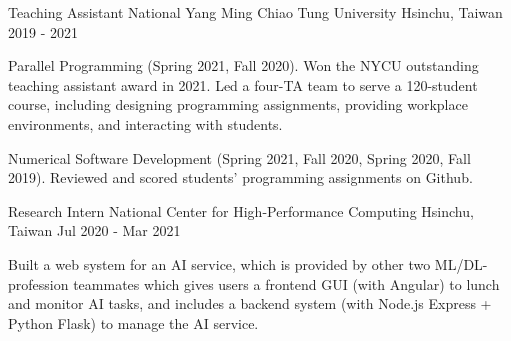
\vspace{-2mm}

\begin{cventries}

  \cventry
    {Teaching Assistant} %
    {National Yang Ming Chiao Tung University} %
    {Hsinchu, Taiwan} %
    {2019 - 2021} %
    {
      \begin{cvitems} %
        \item {Parallel Programming (Spring 2021, Fall 2020). Won the NYCU outstanding teaching assistant award in 2021.
        Led a four-TA team to serve a 120-student course, including designing programming assignments,
        providing workplace environments, and interacting with students.
        }
        \item {Numerical Software Development (Spring 2021, Fall 2020, Spring 2020, Fall 2019).
        Reviewed and scored students' programming assignments on Github.
        }
      \end{cvitems}
    }

    \vspace{-2mm}

  \cventry
    {Research Intern} %
    {National Center for High-Performance Computing} %
    {Hsinchu, Taiwan} %
    {Jul 2020 - Mar 2021} %
    {
      \begin{cvitems} %
        \item {Built a web system for an AI service, which is provided by other two ML/DL-profession teammates
              which gives users a frontend GUI (with Angular) to lunch and monitor AI tasks,
              and includes a backend system (with Node.js Express + Python Flask) to manage the AI service.}
      \end{cvitems}
    }

    \vspace{-2mm}


\end{cventries}
